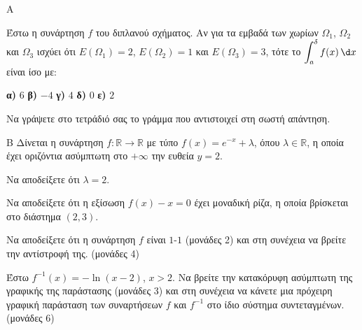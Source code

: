 \begin{thema}{Α}
\begin{erwthma}
{\begin{tikzpicture}[scale=1]
\end{tikzpicture}}{
Έστω η συνάρτηση $f$ του διπλανού σχήματος. Αν για τα εμβαδά των χωρίων $\Omega_1$, $\Omega_2$ και $\Omega_3$ ισχύει ότι $E(\Omega_1) = 2$, $E(\Omega_2) = 1$ και $E(\Omega_3) = 3$, τότε το $\displaystyle\int_a^\delta f(x)\,\d x$ είναι ίσο με:

    \medskip
    \textbf{α)} $6$ \qquad \textbf{β)} $-4$ \qquad \textbf{γ)} $4$ \qquad \textbf{δ)} $0$ \qquad \textbf{ε)} $2$

    \medskip
    Να γράψετε στο τετράδιό σας το γράμμα που αντιστοιχεί στη σωστή απάντηση.
    
}

    
\end{erwthma}
\end{thema}

\begin{thema}{Β}
Δίνεται η συνάρτηση $f: \mathbb{R} \to \mathbb{R}$ με τύπο $f(x) = e^{-x} + \lambda$, όπου $\lambda \in \mathbb{R}$, η οποία έχει οριζόντια ασύμπτωτη στο $+\infty$ την ευθεία $y = 2$.
\begin{erwthma}
    \item Να αποδείξετε ότι $\lambda = 2$. 

    \item Να αποδείξετε ότι η εξίσωση $f(x) - x = 0$ έχει μοναδική ρίζα, η οποία βρίσκεται στο διάστημα $(2, 3)$. 

    \item Να αποδείξετε ότι η συνάρτηση $f$ είναι $1$-$1$ \hfill(μονάδες 2) και στη συνέχεια να βρείτε την αντίστροφή της. \hfill(μονάδες 4) 

    \item Έστω $f^{-1}(x) = -\ln(x-2)$, $x > 2$. Να βρείτε την κατακόρυφη ασύμπτωτη της γραφικής της παράστασης \hfill(μονάδες 3) και στη συνέχεια να κάνετε μια πρόχειρη γραφική παράσταση των συναρτήσεων $f$ και $f^{-1}$ στο ίδιο σύστημα συντεταγμένων. \hfill(μονάδες 6) 
\end{erwthma}
\end{thema}

